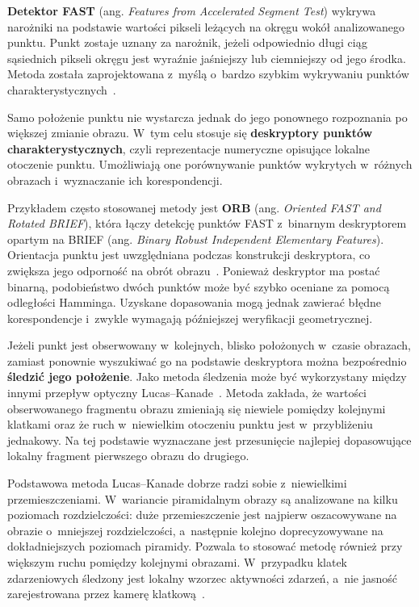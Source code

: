\textbf{Detektor FAST} (ang. \textit{Features from Accelerated Segment Test}) wykrywa narożniki na podstawie wartości pikseli leżących na okręgu wokół analizowanego punktu. Punkt zostaje uznany za narożnik, jeżeli odpowiednio długi ciąg sąsiednich pikseli okręgu jest wyraźnie jaśniejszy lub ciemniejszy od jego środka. Metoda została zaprojektowana z~myślą o~bardzo szybkim wykrywaniu punktów charakterystycznych~\cite{rosten2006fast}.

Samo położenie punktu nie wystarcza jednak do jego ponownego rozpoznania po większej zmianie obrazu. W~tym celu stosuje się \textbf{deskryptory punktów charakterystycznych}, czyli reprezentacje numeryczne opisujące lokalne otoczenie punktu. Umożliwiają one porównywanie punktów wykrytych w~różnych obrazach i~wyznaczanie ich korespondencji.

Przykładem często stosowanej metody jest \textbf{ORB} (ang. \textit{Oriented FAST and Rotated BRIEF}), która łączy detekcję punktów FAST z~binarnym deskryptorem opartym na BRIEF (ang. \textit{Binary Robust Independent Elementary Features}). Orientacja punktu jest uwzględniana podczas konstrukcji deskryptora, co zwiększa jego odporność na obrót obrazu~\cite{rublee2011orb}. Ponieważ deskryptor ma postać binarną, podobieństwo dwóch punktów może być szybko oceniane za pomocą odległości Hamminga. Uzyskane dopasowania mogą jednak zawierać błędne korespondencje i~zwykle wymagają późniejszej weryfikacji geometrycznej.

Jeżeli punkt jest obserwowany w~kolejnych, blisko położonych w~czasie obrazach, zamiast ponownie wyszukiwać go na podstawie deskryptora można bezpośrednio \textbf{śledzić jego położenie}. Jako metoda śledzenia może być wykorzystany między innymi przepływ optyczny Lucas--Kanade~\cite{lucas1981iterative}. Metoda zakłada, że wartości obserwowanego fragmentu obrazu zmieniają się niewiele pomiędzy kolejnymi klatkami oraz że ruch w~niewielkim otoczeniu punktu jest w~przybliżeniu jednakowy. Na tej podstawie wyznaczane jest przesunięcie najlepiej dopasowujące lokalny fragment pierwszego obrazu do drugiego.

Podstawowa metoda Lucas--Kanade dobrze radzi sobie z~niewielkimi przemieszczeniami. W~wariancie piramidalnym obrazy są analizowane na kilku poziomach rozdzielczości: duże przemieszczenie jest najpierw oszacowywane na obrazie o~mniejszej rozdzielczości, a~następnie kolejno doprecyzowywane na dokładniejszych poziomach piramidy. Pozwala to stosować metodę również przy większym ruchu pomiędzy kolejnymi obrazami. W~przypadku klatek zdarzeniowych śledzony jest lokalny wzorzec aktywności zdarzeń, a~nie jasność zarejestrowana przez kamerę klatkową~\cite{rebecq2017eventvio,vidal2018ultimate}.


